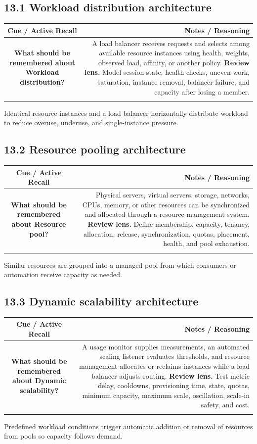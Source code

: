 \documentclass[11pt]{article}
\newcommand{\CornellHeader}{\rowcolor{Navy}\color{white}\bfseries Cue / Active Recall & \color{white}\bfseries Notes / Reasoning \\\endhead}
\newcommand{\CornellRow}[2]{\cellcolor{CueGray}\textbf{#1} & #2 \\\addlinespace[3pt]}
\begin{document}
\subsection{13.1 Workload distribution architecture}
\begin{longtable}{@{}C N@{}}
\CornellHeader
\CornellRow{What should be remembered about Workload distribution?}{A load balancer receives requests and selects among available resource instances using health, weights, observed load, affinity, or another policy. \textbf{Review lens.} Model session state, health checks, uneven work, saturation, instance removal, balancer failure, and capacity after losing a member.}
\end{longtable}
\begin{sectionsummarybox}
Identical resource instances and a load balancer horizontally distribute workload to reduce overuse, underuse, and single-instance pressure.
\end{sectionsummarybox}
\subsection{13.2 Resource pooling architecture}
\begin{longtable}{@{}C N@{}}
\CornellHeader
\CornellRow{What should be remembered about Resource pool?}{Physical servers, virtual servers, storage, networks, CPUs, memory, or other resources can be synchronized and allocated through a resource-management system. \textbf{Review lens.} Define membership, capacity, tenancy, allocation, release, synchronization, quotas, placement, health, and pool exhaustion.}
\end{longtable}
\begin{sectionsummarybox}
Similar resources are grouped into a managed pool from which consumers or automation receive capacity as needed.
\end{sectionsummarybox}
\subsection{13.3 Dynamic scalability architecture}
\begin{longtable}{@{}C N@{}}
\CornellHeader
\CornellRow{What should be remembered about Dynamic scalability?}{A usage monitor supplies measurements, an automated scaling listener evaluates thresholds, and resource management allocates or reclaims instances while a load balancer adjusts routing. \textbf{Review lens.} Test metric delay, cooldowns, provisioning time, state, quotas, minimum capacity, maximum scale, oscillation, scale-in safety, and cost.}
\end{longtable}
\begin{sectionsummarybox}
Predefined workload conditions trigger automatic addition or removal of resources from pools so capacity follows demand.
\end{sectionsummarybox}
\end{document}
